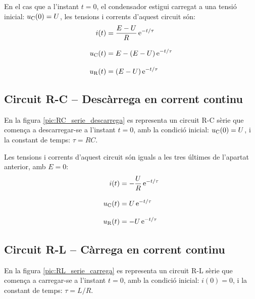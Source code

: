 En el cas que a l'instant $t=0$, el condensador  estigui carregat a una tensió inicial: $u_\mathrm{C}(0) = U$, les tensions i corrents d'aquest circuit són:
\begin{align}
    i(t) &= \frac{E-U}{R}\,\mathrm{e}^{-t/\tau} \\[3mm]
    u_\mathrm{C}(t) &= E  - (E-U) \,\mathrm{e}^{-t/\tau}  \\[3mm]
    u_\mathrm{R}(t) &= (E-U)\,\mathrm{e}^{-t/\tau}
\end{align}

\subsection{Circuit R-C -- Descàrrega en corrent continu}

En la figura \vref{pic:RC_serie_descarrega} es representa un circuit R-C sèrie que comença a descarregar-se a l'instant $t=0$, amb la condició inicial: $u_\mathrm{C}(0) = U$, i la constant de temps: $\tau = R C$.
\begin{center}
    
    \label{pic:RC_serie_descarrega}
\end{center}

Les tensions i corrents d'aquest circuit són iguals a les tres últimes de l'apartat anterior, amb $E=0$:
\begin{align}
    i(t) &= - \frac{U}{R}\,\mathrm{e}^{-t/\tau} \\[3mm]
    u_\mathrm{C}(t) &= U\,\mathrm{e}^{-t/\tau} \\[3mm]
    u_\mathrm{R}(t) &= - U\,\mathrm{e}^{-t/\tau}
\end{align}

\subsection{Circuit R-L -- Càrrega en corrent continu}\label{sec:RL-carrega}

En la figura \vref{pic:RL_serie_carrega} es representa un circuit R-L sèrie que comença a carregar-se a l'instant $t=0$, amb la condició inicial: $i(0) = 0$, i la constant de temps: $\tau = L/R$.
\begin{center}
    
    \label{pic:RL_serie_carrega}
\end{center}

